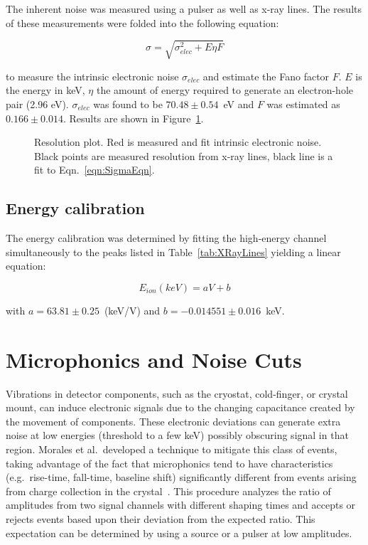 The inherent noise was measured using a pulser as well as x-ray lines.  The results of these measurements were folded into the following equation:

			\begin{equation}
				\sigma = \sqrt{\sigma_{elec}^{2} + E \eta F}
				\label{eqn:SigmaEqn}
			\end{equation}

to measure the intrinsic electronic noise $\sigma_{elec}$ and estimate the Fano factor $F$.  $E$ is the energy in keV, $\eta$ the amount of energy required to generate an electron-hole pair (2.96 eV).  $\sigma_{elec}$ was found to be $70.48\pm0.54$~eV and $F$ was estimated as $0.166\pm0.014$.  Results are shown in Figure~\ref{fig:BeGeResPlot}.

			\begin{figure}
				\centering
				\caption{Resolution plot.  Red is measured and fit intrinsic electronic noise.  Black points are measured resolution from x-ray lines, black line is a fit to 
				Eqn.~\ref{eqn:SigmaEqn}.}
				\label{fig:BeGeResPlot}
			\end{figure}

		\subsection{Energy calibration}

The energy calibration was determined by fitting the high-energy channel simultaneously to the peaks listed in Table~\ref{tab:XRayLines} yielding a linear equation:

			\[
			E_{ion} (keV) = a V + b
			\]  

with $a = 63.81\pm0.25$~(keV/V) and $b = -0.014551\pm0.016$~keV.


	
	
	\section{Microphonics and Noise Cuts}
     	\label{sec:MicroCuts}	

	Vibrations in detector components, such as the cryostat, cold-finger, or crystal mount, can induce electronic signals due to the changing capacitance created by the movement of components.  These electronic deviations can generate extra noise at low energies (threshold to a few keV) possibly obscuring signal in that region.  Morales et al.~developed a technique to mitigate this class of events, taking advantage of the fact that microphonics tend to have characteristics (e.g.~rise-time, fall-time, baseline shift) significantly different from events arising from charge collection in the crystal~\cite{Morales1992410}.  This procedure analyzes the ratio of amplitudes from two signal channels with different shaping times  and accepts or rejects events based upon their deviation from the expected ratio.  This expectation can be determined by using a source or a pulser at low amplitudes.  
	
